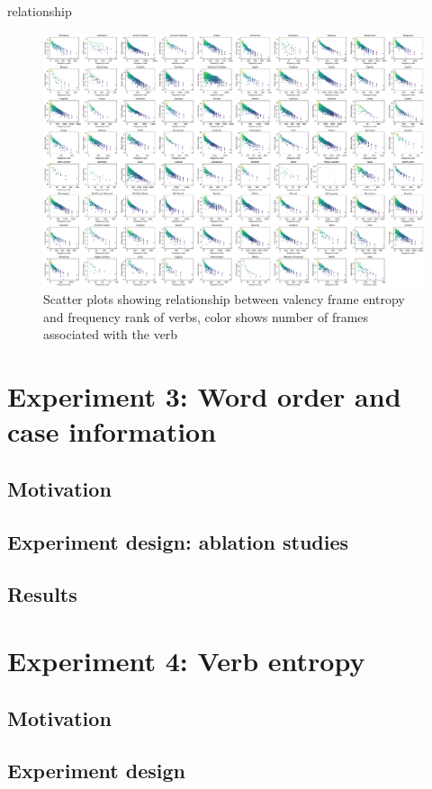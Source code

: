 relationship


\begin{figure}
  \centering
  \includegraphics[width=\textwidth]{figures/joint_entropy_freq.pdf}
  \caption{Scatter plots showing relationship between valency frame entropy and frequency rank of verbs, color shows number of frames associated with the verb}
  \label{fig:joint_entropy_freq}
\end{figure}

\section{Experiment 3: Word order and case information}
\subsection{Motivation}
\subsection{Experiment design: ablation studies}
\subsection{Results}

\section{Experiment 4: Verb entropy}
\subsection{Motivation}
\subsection{Experiment design}
